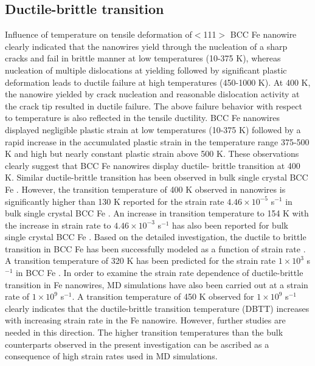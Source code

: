 \documentclass[%
reprint,%
 amssymb, amsmath,%
 aip,apl,%
]{revtex4-1}
\begin{document}
\subsection{Ductile-brittle transition}

Influence of temperature on tensile deformation of$<$111$>$ BCC Fe nanowire clearly indicated that the nanowires yield through the 
nucleation of a sharp cracks and fail in brittle manner at low temperatures (10-375 K), whereas nucleation of multiple dislocations 
at yielding followed by significant plastic deformation leads to ductile failure at high temperatures (450-1000 K). At 400 K, the 
nanowire yielded by crack nucleation and reasonable dislocation activity at the crack tip resulted in ductile failure. The above 
failure behavior with respect to temperature is also reflected in the tensile ductility. BCC Fe nanowires displayed negligible plastic 
strain at low temperatures (10-375 K) followed by a rapid increase in the accumulated plastic strain in the temperature range 375-500 
K and high but nearly constant plastic strain above 500 K. These observations clearly suggest that BCC Fe nanowires display ductile-
brittle transition at 400 K. Similar ductile-brittle transition has been observed in bulk single crystal BCC Fe \cite{BCC-Fe-DBT}. 
However, the transition temperature of 400 K observed in nanowires is significantly higher than 130 K reported for the strain rate 
$4.46 \times 10^{-5}$ s$^{-1}$ in bulk single crystal BCC Fe \cite{BCC-Fe-DBT}. An increase in transition temperature to 154 K with 
the increase in strain rate to $4.46 \times 10^{-3}$ s$^{-1}$ has also been reported for bulk single crystal BCC Fe \cite{BCC-Fe-DBT}. 
Based on the detailed investigation, the ductile to brittle transition in BCC Fe has been successfully modeled as a function of strain 
rate \cite{Kashinath}. A transition temperature of 320 K has been predicted for the strain rate $1 \times 10^{3}$ s$^{-1}$ in BCC Fe 
\cite{Kashinath}. In order to examine the strain rate dependence of ductile-brittle transition in Fe nanowires, MD simulations have 
also been carried out at a strain rate of $1 \times 10^{9}$ s$^{-1}$. A transition temperature of 450 K observed for $1 \times 10^{9}$ 
s$^{-1}$ clearly indicates that the ductile-brittle transition temperature (DBTT) increases with increasing strain rate in the Fe 
nanowire. However, further studies are needed in this direction. The higher transition temperatures than the bulk counterparts observed 
in the present investigation can be ascribed as a consequence of high strain rates used in MD simulations.
\end{document}
